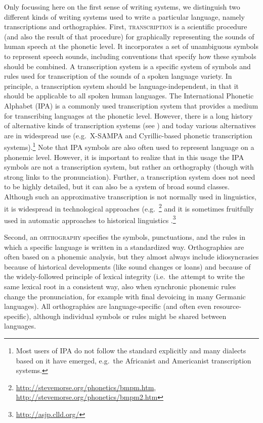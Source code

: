 Only focussing here on the first sense of writing systems, we distinguish two
different kinds of writing systems used to write a particular language, namely
transcriptions and orthographies. First, \textsc{transcription} is a scientific
procedure (and also the result of that procedure) for graphically representing
the sounds of human speech at the phonetic level. It incorporates a set of
unambiguous symbols to represent speech sounds, including conventions that
specify how these symbols should be combined. A transcription system is a
specific system of symbols and rules used for transcription of the sounds of a
spoken language variety. In principle, a transcription system should be
language-independent, in that it should be applicable to all spoken human
languages. The International Phonetic Alphabet (IPA) is a commonly used
transcription system that provides a medium for transcribing languages at the
phonetic level. However, there is a long history of alternative kinds of
transcription systems (see \citet{Kemp1994}) and today various alternatives are
in widespread use (e.g.~X-SAMPA and Cyrillic-based phonetic transcription
systems).\footnote{Most users of IPA do not follow the standard explicitly and
many dialects based on it have emerged, e.g.~the Africanist and Americanist
transcription systems.} Note that IPA symbols are also often used to represent
language on a phonemic level. However, it is important to realize that in this
usage the IPA symbols are not a transcription system, but rather an orthography
(though with strong links to the pronunciation). Further, a transcription system
does not need to be highly detailed, but it can also be a system of broad sound
classes. Although such an approximative transcription is not normally used in
linguistics, it is widespread in technological approaches
(e.g.~\citet{SoundexBeiderMorse2010}\footnote{\url{http://stevemorse.org/phonetics/bmpm.htm},
\url{http://stevemorse.org/phonetics/bmpm2.htm}} and it is sometimes fruitfully
used in automatic approaches to historical linguistics
\citep{Dolgopolsky1986,ASJP16}.\footnote{\url{http://asjp.clld.org/}}

Second, an \textsc{orthography} specifies the symbols, punctuations, and the
rules in which a specific language is written in a standardized way.
Orthographies are often based on a phonemic analysis, but they almost always
include idiosyncrasies because of historical developments (like sound changes or
loans) and because of the widely-followed principle of lexical integrity
(i.e.~the attempt to write the same lexical root in a consistent way, also when
synchronic phonemic rules change the pronunciation, for example with final
devoicing in many Germanic languages). All orthographies are language-specific
(and often even resource-specific), although individual symbols or rules might
be shared between languages.

